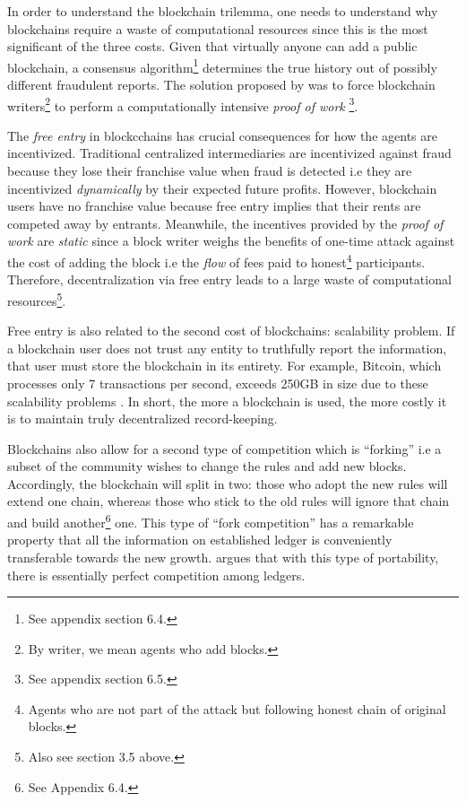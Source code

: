 \documentclass[12pt]{article}
\newcommand{\1}{\mathbbm 1}
\begin{document}
	 In order to understand the blockchain trilemma, one needs to understand why blockchains require a waste of computational resources since this is the most significant of the three costs. Given that virtually anyone can add a public blockchain, a consensus algorithm\footnote{See appendix section 6.4.} determines the true history out of possibly different fraudulent reports. The solution proposed by \cite{nakamoto2008bitcoin} was to force blockchain writers\footnote{By writer, we mean agents who add blocks.} to perform a computationally intensive \textit{proof of work} \footnote{See appendix section 6.5.}.
	 
	 
	 
	 The \textit{free entry} in blockcchains has crucial consequences for how the agents are incentivized. Traditional centralized intermediaries are incentivized against fraud because they lose their franchise value when fraud is detected i.e they are incentivized \textit{dynamically} by their expected future profits. However, blockchain users have no franchise value because free entry implies that their rents are competed away by entrants. Meanwhile, the incentives provided by the \textit{proof of work} are \textit{static} since a block writer weighs the benefits of one-time attack against the cost of adding the block i.e the \textit{flow} of fees paid to honest\footnote{Agents who are not part of the attack but following honest chain of original blocks.} participants. Therefore, decentralization via free entry leads to a large waste of computational resources\footnote{Also see section 3.5 above.}.
	 
	 
	 Free entry is also related to the second cost of blockchains: scalability problem. If a blockchain user does not trust any entity to truthfully report the information, that user must store the blockchain in its entirety. For example, Bitcoin, which processes only 7 transactions per second, exceeds 250GB in size due to these scalability problems \cite{abadi2018blockchain}. In short, the more a blockchain is used, the more costly it is to maintain truly decentralized record-keeping.
	 

	 
	 
	 Blockchains also allow for a second type of competition which is ``forking'' i.e a subset of the community wishes to change the rules and add new blocks. Accordingly, the blockchain will split in two: those who adopt the new rules will extend one chain, whereas those who stick to the old rules will ignore that chain and build another\footnote{See Appendix 6.4.} one. This type of ``fork competition'' has a remarkable property that all the information on established ledger is conveniently transferable towards the new growth. \cite{abadi2018blockchain} argues that with this type of portability, there is essentially perfect competition among ledgers.
	 
\end{document}
